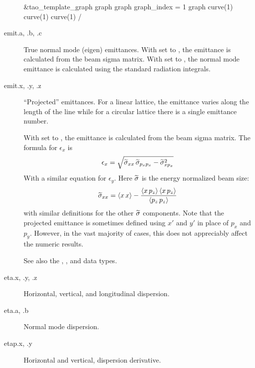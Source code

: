 \begin{description}
\begin{example}
  &tao_template_graph
    graph%
    graph%
    graph_index = 1
    graph%
    curve(1)%
    curve(1)%
    curve(1)%
  /
\end{example}

  \item[emit.a, .b, .c] \Newline {}
True normal mode (eigen) emittances.  With  set to , the
emittance is calculated from the beam sigma matrix. With  set to
, the normal mode emittance is calculated using the standard radiation
integrals.

  \item[emit.x, .y, .z] \Newline {}
``Projected'' emittances\cite{b:emit}. 
For a linear lattice, the emittance varies along the length
of the line while for a circular lattice there is a single emittance
number. 

With  set to , the emittance is calculated from the beam sigma
matrix. The formula for $\epsilon_x$ is
\begin{equation}
  \epsilon_x = \sqrt{ \widetilde\sigma_{xx} \, \widetilde\sigma_{p_xp_x} - \widetilde\sigma_{xp_x}^2}
\end{equation}
With a similar equation for $\epsilon_y$. Here $\widetilde\sigma$ is the energy normalized
beam size:
\begin{equation}
  \widetilde\sigma_{xx} = \langle x \, x \rangle - 
  \frac{\langle x \, p_z \rangle \, \langle x \, p_z \rangle}{\langle p_z \, p_z \rangle}
\end{equation}
with similar definitions for the other $\widetilde\sigma$ components. 
Note that the projected emittance is sometimes defined using
$x'$ and $y'$ in place of $p_x$ and $p_y$. However, in the vast
majority of cases, this does not appreciably affect the numeric
results.

See also the , , and
 data types.

  \item[eta.x, .y, .z] \Newline {}
Horizontal, vertical, and longitudinal dispersion.

  \item[eta.a, .b] \Newline {}
Normal mode dispersion.

  \item[etap.x, .y] \Newline {}
Horizontal and vertical, dispersion derivative.


\end{description}
